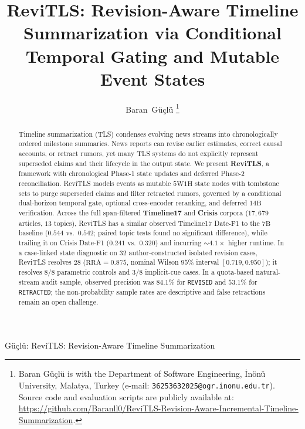 \documentclass[journal]{IEEEtran}
\begin{document}
\title{ReviTLS: Revision-Aware Timeline Summarization via Conditional Temporal Gating and Mutable Event States}

\author{Baran~G\"{u}\c{c}l\"{u}%
\thanks{Baran G\"{u}\c{c}l\"{u} is with the Department of Software Engineering, \.{I}n\"{o}n\"{u} University, Malatya, Turkey (e-mail: \texttt{36253632025@ogr.inonu.edu.tr}). Source code and evaluation scripts are publicly available at: \protect\url{https://github.com/Baranll0/ReviTLS-Revision-Aware-Incremental-Timeline-Summarization}.}}

%
{G\"{u}\c{c}l\"{u}: ReviTLS: Revision-Aware Timeline Summarization}

\maketitle

\begin{abstract}
Timeline summarization (TLS) condenses evolving news streams into chronologically ordered milestone summaries. News reports can revise earlier estimates, correct causal accounts, or retract rumors, yet many TLS systems do not explicitly represent superseded claims and their lifecycle in the output state. We present \textbf{ReviTLS}, a framework with chronological Phase-1 state updates and deferred Phase-2 reconciliation. ReviTLS models events as mutable $5\text{W}1\text{H}$ state nodes with tombstone sets to purge superseded claims and filter retracted rumors, governed by a conditional dual-horizon temporal gate, optional cross-encoder reranking, and deferred $14\text{B}$ verification. Across the full span-filtered \textbf{Timeline17} and \textbf{Crisis} corpora ($17{,}679$ articles, $13$ topics), ReviTLS has a similar observed Timeline17 Date-F1 to the $7\text{B}$ baseline ($0.544$ vs.\ $0.542$; paired topic tests found no significant difference), while trailing it on Crisis Date-F1 ($0.241$ vs.\ $0.320$) and incurring $\sim 4.1\times$ higher runtime. In a case-linked state diagnostic on $32$ author-constructed isolated revision cases, ReviTLS resolves $28$ ($\text{RRA}=0.875$, nominal Wilson $95\%$ interval $[0.719,0.950]$); it resolves $8/8$ parametric controls and $3/8$ implicit-cue cases. In a quota-based natural-stream audit sample, observed precision was $84.1\%$ for \texttt{REVISED} and $53.1\%$ for \texttt{RETRACTED}; the non-probability sample rates are descriptive and false retractions remain an open challenge.
\end{abstract}
\end{document}
